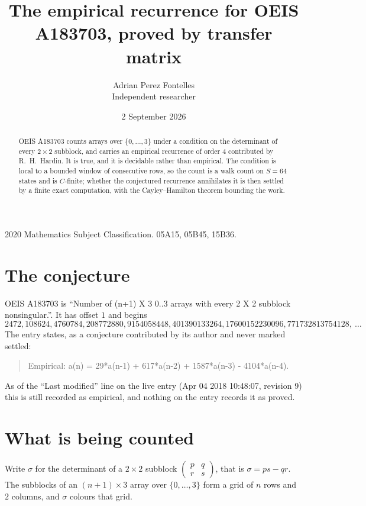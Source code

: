 \documentclass[11pt,a4paper]{article}
\title{The empirical recurrence for OEIS A183703, proved by transfer matrix}
\author{Adrian Perez Fontelles\\ \small Independent researcher}
\date{2 September 2026}
\theoremstyle{plain}
\theoremstyle{definition}
\begin{document}
\maketitle

\begin{abstract}
OEIS A183703 counts arrays over $\{0,\dots,3\}$ under a condition on the determinant of every
$2\times2$ subblock, and carries an empirical recurrence of order $4$ contributed by
R.~H.~Hardin. It is true, and it is decidable rather than empirical. The condition is local to
a bounded window of consecutive rows, so the count is a walk count on $S=64$ states and is
$C$-finite; whether the conjectured recurrence annihilates it is then settled by a finite exact
computation, with the Cayley--Hamilton theorem bounding the work.
\end{abstract}

\noindent\small 2020 Mathematics Subject Classification. 05A15, 05B45, 15B36.\normalsize

\section{The conjecture}

OEIS A183703 is ``Number of (n+1) X 3 0..3 arrays with every 2 X 2 subblock nonsingular.''. It has offset $1$ and begins
\[
2472, 108624, 4760784, 208772880, 9154058448, 401390133264, 17600152230096, 771732813754128,\ \dots
\]
The entry states, as a conjecture contributed by its author and never marked settled:
\begin{quote}
Empirical: a(n) = 29*a(n-1) + 617*a(n-2) + 1587*a(n-3) - 4104*a(n-4).
\end{quote}
As of the ``Last modified'' line on the live entry (Apr 04 2018 10:48:07, revision 9) this is still
recorded as empirical, and nothing on the entry records it as proved.

\section{What is being counted}

Write $\sigma$ for the determinant of a $2\times2$ subblock
$\begin{pmatrix}p&q\\r&s\end{pmatrix}$, that is $\sigma=ps-qr$. The subblocks of an
$(n+1)\times3$ array over $\{0,\dots,3\}$ form a grid of $n$ rows and $2$
columns, and $\sigma$ colours that grid.
\end{document}
